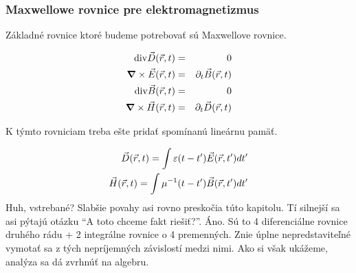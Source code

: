 \subsubsection{Maxwellowe rovnice pre elektromagnetizmus}


Základné rovnice ktoré budeme potrebovať sú Maxwellove
rovnice.

\def\rt{{(\vektor{r},t)}}
\def\kw{{(\vektor{k},\omega)}}

\begin{eqnarray}
  \div{\vektor{D}\rt} & = & 0 \\
  \curl{\vektor{E}\rt} & = & \partial_t \vektor{B} \rt \\
  \div{\vektor{B}\rt} & = & 0 \\
  \curl{\vektor{H}\rt} & = & \partial_t \vektor{D} \rt
\end{eqnarray}

K týmto rovniciam treba ešte pridať spomínanú lineárnu pamäť.

\begin{eqnarray}
  \vektor{D}\rt = \int \eps(t-t') \vektor{E}(\vektor{r},t') dt' \\
  \vektor{H}\rt = \int \mu^{-1}(t-t') \vektor{B}(\vektor{r},t') dt'
\end{eqnarray}
Huh, vstrebané? Slabšie povahy asi rovno preskočia túto kapitolu. Tí
silnejší sa asi pýtajú otázku ``A toto chceme fakt riešiť?''. Áno.
Sú to 4 diferenciálne rovnice druhého rádu + 2 integrálne rovnice o 4
premenných. Znie úplne nepredstaviteľné vymotať sa z tých nepríjemných
závislostí medzi nimi. Ako si však ukážeme, analýza sa dá zvrhnúť na
algebru.


